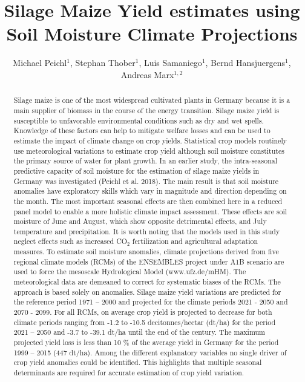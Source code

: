 \documentclass[12pt]{iopart}
\begin{document}
	
\title[Silage Maize Yield Estimates using Soil Moisture Climate Projections]{Silage Maize Yield estimates using Soil Moisture Climate Projections}
\author{Michael Peichl$^1$, Stephan Thober$^1$, Luis Samaniego$^1$, Bernd Hansjuergens$^1$, Andreas Marx$^{1,2}$}

\address{$^1$ Department Computational Hydrosystems, Helmholtz Centre for Environmental Research - UFZ, Permoserstrasse 15, D-04318 Leipzig, Germany}
\address{$^2$ Climate Office for Central Germany, Helmholtz Centre for Environmental Research - UFZ, Permoserstrasse 15, D-04318 Leipzig, Germany}

\begin{abstract}
Silage maize is one of the most widespread cultivated plants in Germany because it is a main supplier of biomass in the course of the energy transition. Silage maize yield is susceptible to unfavorable environmental conditions such as dry and wet spells. Knowledge of these factors can help to mitigate welfare losses and can be used to estimate the impact of climate change on crop yields. 
Statistical crop models routinely use meteorological variations to estimate crop yield although soil moisture constitutes the primary source of water for plant growth. In an earlier study, the intra-seasonal predictive capacity of soil moisture for the estimation of silage maize yields in Germany was investigated  (Peichl et al. 2018). The main result is that soil moisture anomalies have exploratory skills which vary in magnitude and direction depending on the month. 
The most important seasonal effects are then combined here in a reduced panel model to enable a more holistic climate impact assessment. These effects are soil moisture of June and August, which show opposite detrimental effects, and July temperature and precipitation. It is worth noting that the models used in this study neglect effects such as increased CO$_2$ fertilization and agricultural adaptation measures.  
To estimate soil  moisture anomalies, climate projections derived from five regional climate models (RCMs) of the ENSEMBLES project under A1B scenario are used to force the mesoscale Hydrological Model (www.ufz.de/mHM). The meteorological data are demeaned to correct for systematic biases of the RCMs. The approach is based solely on anomalies. Silage maize yield variations are predicted for the reference period 1971 – 2000 and projected for the climate periods  2021 - 2050 and 2070 - 2099. For all RCMs, on average crop yield is projected to decrease for both climate periods ranging from -1.2 to -10.5 decitonnes/hectar (dt/ha) for the period 2021 – 2050 and -3.7 to -39.1 dt/ha until the end of the century. The maximum projected yield loss is less than 10 \% of the average yield in Germany for the period 1999 – 2015 (447  dt/ha). Among the different explanatory variables no single driver of crop yield anomalies could be identified. This highlights that multiple seasonal determinants are required for accurate estimation of crop yield variation. 


% 

\end{abstract}
\end{document}
